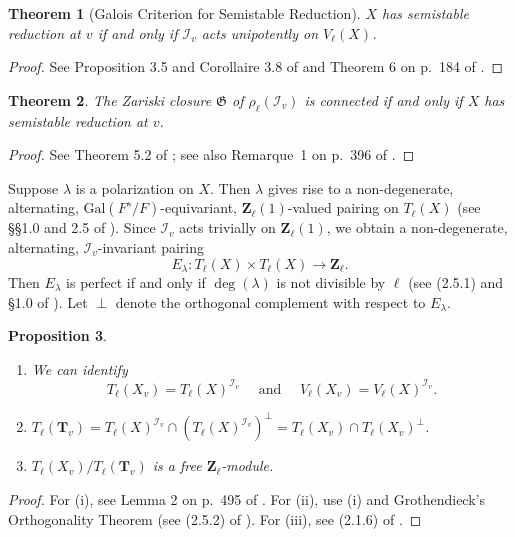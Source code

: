 \documentclass{amsart}
\def\Z{{\mathbf Z}}
\def\Gal{\mathrm{Gal}}
\def\I{{\mathcal I}}
\def\r{{\mathfrak G}}
\def\T{{\mathbf T}}
\newtheorem{thm}{Theorem}[section]
\newtheorem{prop}[thm]{Proposition}
\theoremstyle{definition}
\begin{document}
\begin{thm}[Galois Criterion for Semistable Reduction]
\label{galcrit}
$X$ has semistable reduction at $v$ if and only if 
$\I_{v}$ acts unipotently on $V_\ell(X)$.
\end{thm}

\begin{proof}
See Proposition 3.5 and Corollaire 3.8 of \cite{SGA} 
and Theorem 6 on p.~184 of \cite{BLR}.
\end{proof}

\begin{thm}
\label{conn}
The Zariski closure $\r$ of $\rho_{\ell}(\I_v)$ is connected
if and only if $X$ has semistable reduction at $v$.
\end{thm}

\begin{proof}
See Theorem 5.2 of \cite{Compositio}; see also Remarque~1 on
p.~396 of \cite{Motives}. 
\end{proof}

Suppose $\lambda$ is a polarization on $X$.
Then $\lambda$ gives rise to a non-degenerate, alternating,
$\Gal(F^{s}/F)$-equi\-var\-i\-ant, $\Z_\ell(1)$-valued 
pairing on $T_{\ell}(X)$ (see \S\S 1.0 and 2.5 of \cite{SGA}).
Since $\I_v$ acts trivially on $\Z_\ell(1)$, we obtain
a non-degenerate, alternating, $\I_v$-invariant pairing
$$E_\lambda : T_\ell(X) \times T_\ell(X) \to \Z_\ell.$$
Then $E_\lambda$ is perfect if and only if $\deg(\lambda)$
is not divisible by $\ell$ (see (2.5.1) and \S 1.0 of
\cite{SGA}).
Let $\perp$ denote the orthogonal complement with respect to 
$E_\lambda$.

\begin{prop}
\label{serretateeqn}
\begin{enumerate}
\item[(i)]
We can identify
$$T_\ell(X_v)=T_\ell(X)^{\I_v} \quad \text{ and } \quad
V_\ell(X_v)=V_\ell(X)^{\I_v}.$$
\item[(ii)] $T_\ell(\T_v)=T_\ell(X)^{\I_v} \cap (T_\ell(X)^{\I_v})^\perp
= T_\ell(X_v) \cap T_\ell(X_v)^{\perp}$.
\item[(iii)] $T_\ell(X_v)/T_\ell(\T_v)$ is a free $\Z_\ell$-module.
\end{enumerate}
\end{prop}

\begin{proof}
For (i), see Lemma 2 on p.~495 of \cite{SerreTate}.
For (ii), use (i) and Grothendieck's Orthogonality Theorem 
(see (2.5.2) of \cite{SGA}).
For (iii), see (2.1.6) of \cite{SGA}.
\end{proof}
\end{document}
